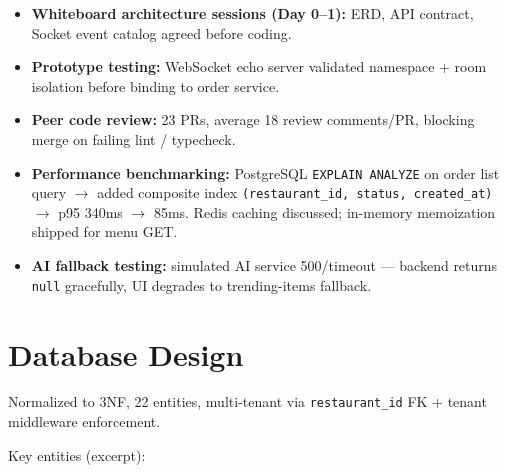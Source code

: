 \begin{itemize}
\item \textbf{Whiteboard architecture sessions (Day 0--1):} ERD, API contract, Socket event catalog agreed before coding.
\item \textbf{Prototype testing:} WebSocket echo server validated namespace + room isolation before binding to order service.
\item \textbf{Peer code review:} 23 PRs, average 18 review comments/PR, blocking merge on failing lint / typecheck.
\item \textbf{Performance benchmarking:} PostgreSQL \texttt{EXPLAIN ANALYZE} on order list query $\rightarrow$ added composite index \texttt{(restaurant\_id, status, created\_at)} $\rightarrow$ p95 340ms $\rightarrow$ 85ms. Redis caching discussed; in-memory memoization shipped for menu GET.
\item \textbf{AI fallback testing:} simulated AI service 500/timeout --- backend returns \texttt{null} gracefully, UI degrades to trending-items fallback.
\end{itemize}

\section{Database Design}
\label{sec:database}

Normalized to 3NF, 22 entities, multi-tenant via \texttt{restaurant\_id} FK + tenant middleware enforcement.

Key entities (excerpt):

